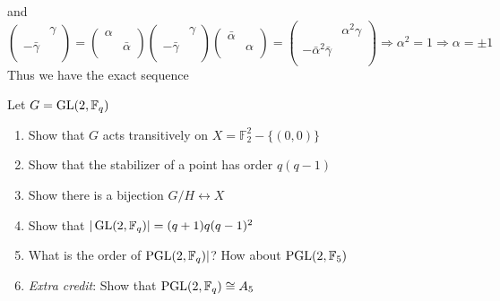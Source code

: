 \documentclass[main]{subfiles}
\begin{document}
and 
$$
\left( {\begin{array}{cc}
    & \gamma  \\
    -\bar\gamma &  \\
  \end{array} } \right)=\left( {\begin{array}{cc}
   \alpha &  \\
     & \bar\alpha \\
  \end{array} } \right)\left( {\begin{array}{cc}
    & \gamma  \\
    -\bar\gamma &  \\
  \end{array} } \right)\left( {\begin{array}{cc}
   \bar\alpha &   \\
     & \alpha \\
  \end{array} } \right)=\left( {\begin{array}{cc}
    & \alpha^2\gamma  \\
    -\bar\alpha^2\bar\gamma &  \\
  \end{array} } \right)\Rightarrow \alpha^2=1\Rightarrow \alpha=\pm1
$$
Thus we have the exact sequence
\begin{center}
\end{center}

\begin{exercise}
Let $G=\operatorname{GL}(2,\mathbb F_q)$
\begin{enumerate}[label=(\alph*),leftmargin=*]
\item Show that $G$ acts transitively on $X=\mathbb F^2_2-\{(0,0)\}$
\item Show that the stabilizer of a point has order $q(q-1)$
\item Show there is a bijection $G/H\leftrightarrow X$
\item Show that $|\operatorname{GL}(2,\mathbb F_q)|=(q+1)q(q-1)^2$
\item What is the order of $\operatorname{PGL}(2,\mathbb F_q)|$? How about $\operatorname{PGL}(2,\mathbb F_5)$
\item \textit{Extra credit}: Show that $\operatorname{PGL}(2,\mathbb F_q)\cong A_5$
\end{enumerate}
\end{exercise}
\end{document}
